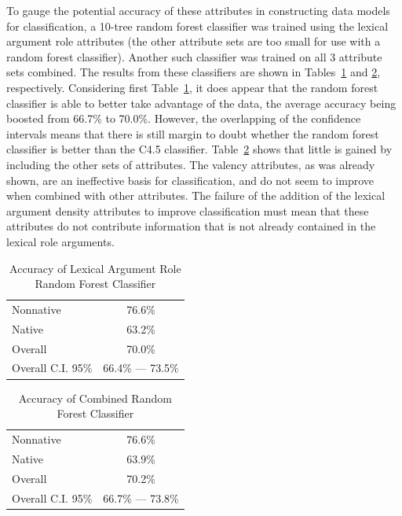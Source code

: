 \documentclass[main.tex]{subfiles}
\begin{document}
To gauge the potential accuracy of these attributes in constructing data models for classification, a 10-tree random forest classifier was trained using the lexical argument role attributes (the other attribute sets are too small for use with a random forest classifier). Another such classifier was trained on all 3 attribute sets combined. The results from these classifiers are shown in Tables~\ref{table:lex-role-rf-results} and \ref{table:combined-rf-results}, respectively. Considering first Table~\ref{table:lex-role-rf-results}, it does appear that the random forest classifier is able to better take advantage of the data, the average accuracy being boosted from 66.7\% to 70.0\%. However, the overlapping of the confidence intervals means that there is still margin to doubt whether the random forest classifier is better than the C4.5 classifier. Table~\ref{table:combined-rf-results} shows that little is gained by including the other sets of attributes. The valency attributes, as was already shown, are an ineffective basis for classification, and do not seem to improve when combined with other attributes. The failure of the addition of the lexical argument density attributes to improve classification must mean that these attributes do not contribute information that is not already contained in the lexical role arguments.

\begin{table}[ht]
\centering
\caption{Accuracy of Lexical Argument Role Random Forest Classifier}
\begin{tabular}{l c}
\toprule
Nonnative & 76.6\% \\
Native & 63.2\% \\
Overall & 70.0\% \\
Overall C.I. 95\% & 66.4\% --- 73.5\%\\
\bottomrule
\end{tabular}
\label{table:lex-role-rf-results}
\end{table}

\begin{table}[ht]
\centering
\caption{Accuracy of Combined Random Forest Classifier}
\begin{tabular}{l c}
\toprule
Nonnative & 76.6\% \\
Native & 63.9\% \\
Overall & 70.2\% \\
Overall C.I. 95\% & 66.7\% --- 73.8\%\\
\bottomrule
\end{tabular}
\label{table:combined-rf-results}
\end{table}


\newpage
\biblio
\end{document}
